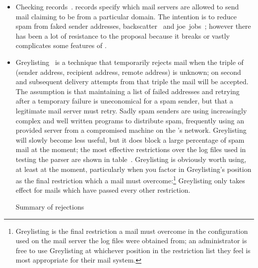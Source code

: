 \begin{itemize}

    \item Checking \SPF{} records~\cite{openspf, Wikipedia-spf}.
        \SPF{}\label{spf introduction} records specify which mail servers
        are allowed to send mail claiming to be from a particular domain.
        The intention is to reduce spam from faked sender addresses,
        backscatter~\cite{postfix-backscatter} and
        joe~jobs~\cite{Wikipedia-joe-job}; however there has been a lot of
        resistance to the proposal because it breaks or vastly complicates
        some features of \SMTP{}\@.

    \item Greylisting~\cite{greylisting} is a technique that temporarily
        rejects mail when the triple of (sender address, recipient address,
        remote \IP{} address) is unknown; on second and subsequent delivery
        attempts from that triple the mail will be accepted.  The
        assumption is that maintaining a list of failed addresses and
        retrying after a temporary failure is uneconomical for a spam
        sender, but that a legitimate mail server must retry.  Sadly spam
        senders are using increasingly complex and well written programs to
        distribute spam, frequently using an \ISP{} provided \SMTP{} server
        from a compromised machine on the \ISP{}'s network.  Greylisting
        will slowly become less useful, but it does block a large
        percentage of spam mail at the moment; the most effective
        restrictions over the \numberOFlogFILES{} log files used in testing
        the parser are shown in table~.
        Greylisting is obviously worth using, at least at the moment,
        particularly when you factor in Greylisting's position as the final
        restriction which a mail must overcome:\footnote{Greylisting is the
        final restriction a mail must overcome in the configuration used on
        the mail server the log files were obtained from; an administrator
        is free to use Greylisting at whichever position in the restriction
        list they feel is most appropriate for their mail system.}
        Greylisting only takes effect for mails which have passed every
        other restriction.

        \begin{table}[ht]
            \caption{Summary of rejections}\label{Summary of rejections}
            
        \end{table}


\end{itemize}
